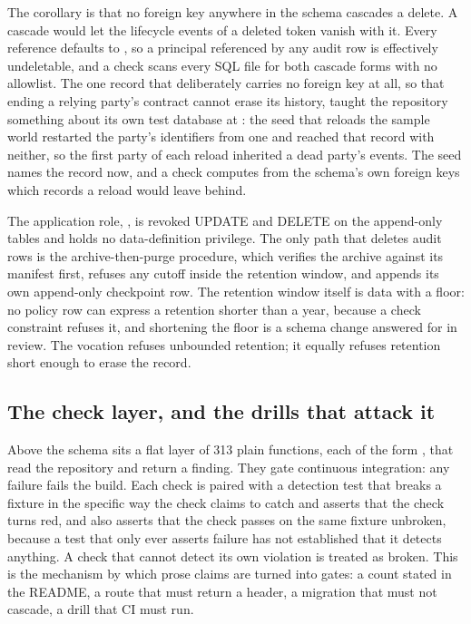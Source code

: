 The corollary is that no foreign key anywhere in the schema cascades a delete. A cascade would let
the lifecycle events of a deleted token vanish with it. Every reference defaults to , so a principal referenced by any audit row is effectively undeletable, and a check scans
every SQL file for both cascade forms with no allowlist. The one record that deliberately carries no
foreign key at all, so that ending a relying party's contract cannot erase its history, taught the
repository something about its own test database at : the seed that reloads the
sample world restarted the party's identifiers from one and reached that record with neither, so
the first party of each reload inherited a dead party's events. The seed names the record now, and a
check computes from the schema's own foreign keys which records a reload would leave behind.

The application role, , is revoked UPDATE and DELETE on the append-only tables
and holds no data-definition privilege. The only path that deletes audit rows is the archive-then-purge
procedure, which verifies the archive against its manifest first, refuses any cutoff inside the
retention window, and appends its own append-only checkpoint row. The retention window itself is
data with a floor: no policy row can express a retention shorter than a year, because a check
constraint refuses it, and shortening the floor is a schema change answered for in review. The
vocation refuses unbounded retention; it equally refuses retention short enough to erase the record.
\sImpl

\subsection{The check layer, and the drills that attack it}

Above the schema sits a flat layer of 313 plain functions, each of the form
, that read the repository and return a finding. They gate continuous
integration: any failure fails the build. Each check is paired with a detection test that breaks a
fixture in the specific way the check claims to catch and asserts that the check turns red, and also asserts that the check passes on the same fixture unbroken, because a test
that only ever asserts failure has not established that it detects anything. A check that cannot
detect its own violation is treated as broken. This is the mechanism by which prose claims are turned
into gates: a count stated in the README, a route that must return a header, a migration that must
not cascade, a drill that CI must run. \sImpl

